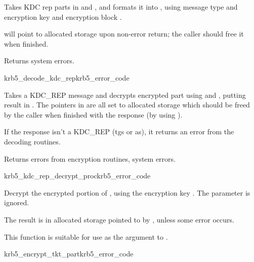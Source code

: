 \internalfunc

Takes KDC rep parts in  and , and
formats it into , using message type
 and encryption key  and
encryption block .

 will point to  allocated storage upon
non-error return; the caller should free it when finished.

Returns system errors.

\begin{funcdecl}{krb5_decode_kdc_rep}{krb5_error_code}{\funcinout}
\funcin
{}
\funcout
{}
\end{funcdecl}

\internalfunc

Takes a KDC_REP message and decrypts encrypted part using
 and , putting result in .
The pointers in 
are all set to allocated storage which should be freed by the caller
when finished with the response (by using ).


If the response isn't a KDC_REP (tgs or as), it returns an error from
the decoding routines.

Returns errors from encryption routines, system errors.

\begin{funcdecl}{krb5_kdc_rep_decrypt_proc}{krb5_error_code}{\funcinout}
\funcin
{}
\funcinout
{}
\end{funcdecl}

Decrypt the encrypted portion of , using the
encryption key .  The parameter  is
ignored.

The result is in allocated storage pointed to by
, unless some error occurs.

This function is suitable for use as the 
argument to .

\begin{funcdecl}{krb5_encrypt_tkt_part}{krb5_error_code}{\funcinout}
\funcin
{}
\funcinout
{}
\end{funcdecl}

